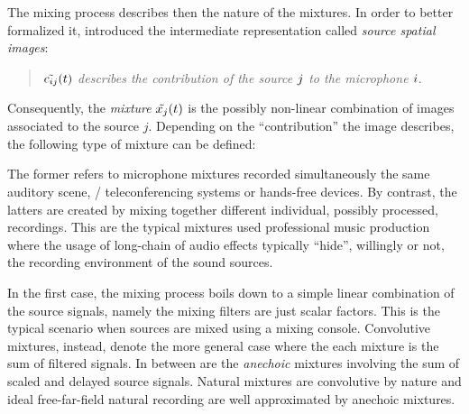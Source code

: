 The mixing process describes then the nature of the mixtures.
In order to better formalized it, \citeauthor{sturmel2012linear} introduced the intermediate representation called \emph{source spatial images}:
\begin{quote}
    \textit{$\contTime[t]{\img_{\idxMic\idxSrc}}$ describes the contribution of the source $j$ to the microphone $i$}.
\end{quote}
Consequently, the \textit{mixture} $\contTime[t]{\mic_{\idxSrc}}$ is the possibly non-linear combination of images associated to the source $j$.
Depending on the ``contribution'' the image describes, the following type of mixture can be defined:

The former refers to microphone mixtures recorded simultaneously the same auditory scene, \eg/ teleconferencing systems or hands-free devices.
By contrast, the latters are created by mixing together different individual, possibly processed, recordings.
This are the typical mixtures used professional music production where the usage of long-chain of audio effects typically ``hide'', willingly or not, the recording environment of the sound sources.

In the first case, the mixing process boils down to a simple linear combination of the source signals, namely
the mixing filters are just scalar factors.
This is the typical scenario when sources are mixed using a mixing console.
Convolutive mixtures, instead, denote the more general case where the each mixture is the sum of filtered signals.
In between are the \textit{anechoic} mixtures involving the sum of scaled and delayed source signals.
Natural mixtures are convolutive by nature and ideal free-far-field natural recording are well approximated by anechoic mixtures.

